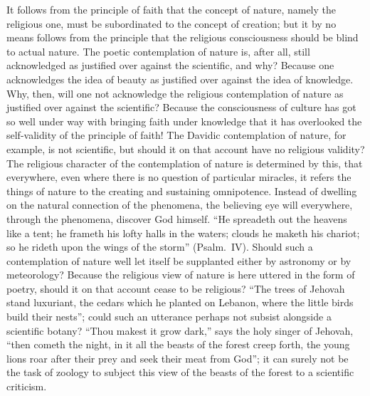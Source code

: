 \documentclass[12pt]{book}
\newcommand{\opage}[1]{\marginnote{\footnotesize\textit{[#1]}}}
\begin{document}
\opage{168}\setcounter{footnote}{0}%
It follows from the principle of faith that the concept of nature,
namely the religious one, must be subordinated to the concept of
creation; but it by no means follows from the principle that the
religious consciousness should be blind to actual nature. The poetic
contemplation of nature is, after all, still acknowledged as justified
over against the scientific, and why? Because one acknowledges the idea
of beauty as justified over against the idea of knowledge. Why, then,
will one not acknowledge the religious contemplation of nature as
justified over against the scientific? Because the consciousness of
culture has got so well under way with bringing faith under knowledge
that it has overlooked the self-validity of the principle of faith! The
Davidic contemplation of nature, for example, is not scientific, but
should it on that account have no religious validity? The religious
character of the contemplation of nature is determined by this, that
everywhere, even where there is no question of particular miracles, it
refers the things of nature to the creating and sustaining omnipotence.
Instead of dwelling on the natural connection of the phenomena, the
believing eye will everywhere, through the phenomena, discover God
himself. ``He spreadeth out the heavens like a tent; he frameth his
lofty halls in the waters; clouds he maketh his chariot; so he rideth
upon the wings of the storm'' (Psalm.\ IV). Should such a
contemplation of nature well let itself be supplanted either by
astronomy or by meteorology? Because the religious view of nature is
here uttered in the form of poetry, should it on that account cease to
be religious? ``The trees of Jehovah stand luxuriant, the cedars which
he planted on Lebanon, where the little birds build their nests''; could
such an utterance perhaps not subsist alongside a scientific botany?
``Thou makest it grow dark,'' says the holy singer of Jehovah, ``then
cometh the night, in it all the beasts of the forest creep forth, the
young lions roar after their prey and seek their meat
\opage{169}\setcounter{footnote}{0}%
from God''; it can surely not be the task of zoology to subject this
view of the beasts of the forest to a scientific criticism.
\end{document}
